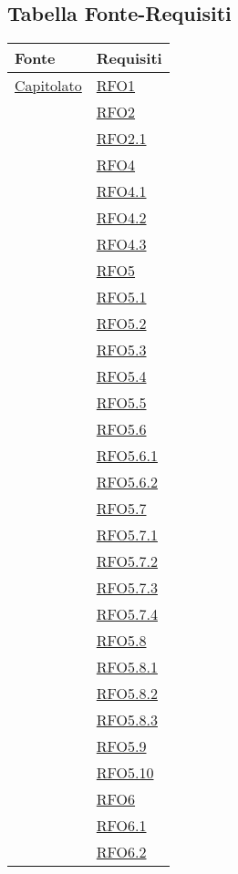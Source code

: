 \newpage
\subsection{Tabella Fonte-Requisiti}
\normalsize
\begin{longtable}{|>{\centering}m{5cm}|m{5cm}<{\centering}|}
\hline 
\textbf{Fonte} & \textbf{Requisiti}\\
\hline
\endhead
\hyperlink{Capitolato}{Capitolato} & \hyperlink{RFO1}{RFO1}\\
& \hyperlink{RFO2}{RFO2}\\
& \hyperlink{RFO2.1}{RFO2.1}\\
& \hyperlink{RFO4}{RFO4}\\
& \hyperlink{RFO4.1}{RFO4.1}\\
& \hyperlink{RFO4.2}{RFO4.2}\\
& \hyperlink{RFO4.3}{RFO4.3}\\
& \hyperlink{RFO5}{RFO5}\\
& \hyperlink{RFO5.1}{RFO5.1}\\
& \hyperlink{RFO5.2}{RFO5.2}\\
& \hyperlink{RFO5.3}{RFO5.3}\\
& \hyperlink{RFO5.4}{RFO5.4}\\
& \hyperlink{RFO5.5}{RFO5.5}\\
& \hyperlink{RFO5.6}{RFO5.6}\\
& \hyperlink{RFO5.6.1}{RFO5.6.1}\\
& \hyperlink{RFO5.6.2}{RFO5.6.2}\\
& \hyperlink{RFO5.7}{RFO5.7}\\
& \hyperlink{RFO5.7.1}{RFO5.7.1}\\
& \hyperlink{RFO5.7.2}{RFO5.7.2}\\
& \hyperlink{RFO5.7.3}{RFO5.7.3}\\
& \hyperlink{RFO5.7.4}{RFO5.7.4}\\
& \hyperlink{RFO5.8}{RFO5.8}\\
& \hyperlink{RFO5.8.1}{RFO5.8.1}\\
& \hyperlink{RFO5.8.2}{RFO5.8.2}\\
& \hyperlink{RFO5.8.3}{RFO5.8.3}\\
& \hyperlink{RFO5.9}{RFO5.9}\\
& \hyperlink{RFO5.10}{RFO5.10}\\
& \hyperlink{RFO6}{RFO6}\\
& \hyperlink{RFO6.1}{RFO6.1}\\
& \hyperlink{RFO6.2}{RFO6.2}\\

\end{longtable}
